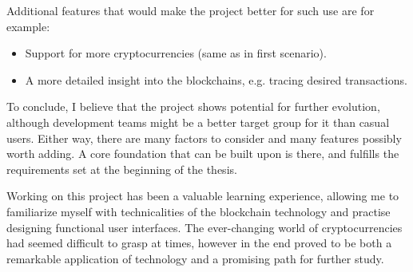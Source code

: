 Additional features that would make the project better
for such use are for example:
\begin{itemize}
    \item Support for more cryptocurrencies (same as in first scenario).
    \item A more detailed insight into the blockchains,
    e.g. tracing desired transactions.
\end{itemize}

To conclude, I believe that the project shows potential for further evolution,
although development teams might be a better target group for it
than casual users.
Either way, there are many factors to consider
and many features possibly worth adding.
A core foundation that can be built upon is there,
and fulfills the requirements set at the beginning of the thesis.

Working on this project has been a valuable learning experience,
allowing me to familiarize myself with technicalities of the blockchain technology and practise designing functional user interfaces.
The ever-changing world of cryptocurrencies had seemed difficult
to grasp at times, however in the end proved to be
both a remarkable application of technology
and a promising path for further study.
